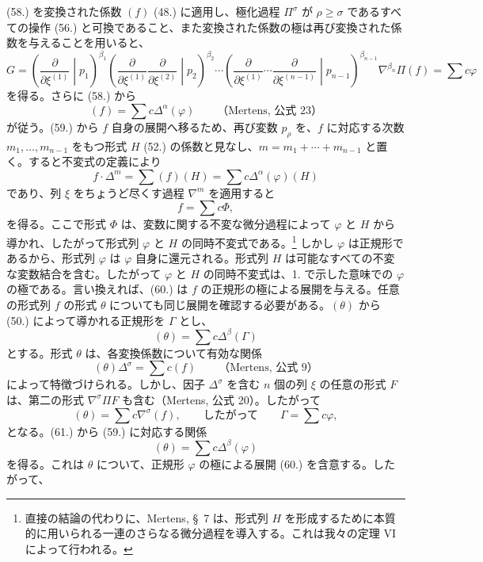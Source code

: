 \documentclass[11pt]{article}
\begin{document}
(58.) を変換された係数 $(f)$ (48.) に適用し、極化過程 $\Pi^\sigma$ が $\rho\ge\sigma$ であるすべての操作 (56.) と可換であること、また変換された係数の極は再び変換された係数を与えることを用いると、
\[
 G=\left(\frac{\partial}{\partial\xi^{(1)}}\middle|p_1\right)^{\beta_1}
 \left(\frac{\partial}{\partial\xi^{(1)}}\frac{\partial}{\partial\xi^{(2)}}\middle|p_2\right)^{\beta_2}
 \cdots
 \left(\frac{\partial}{\partial\xi^{(1)}}\cdots\frac{\partial}{\partial\xi^{(n-1)}}\middle|p_{n-1}\right)^{\beta_{n-1}}
 \nabla^{\beta_n}\Pi(f)=\sum c\varphi
\]
を得る。さらに (58.) から
\begin{equation}
 (f)=\sum c\Delta^\alpha(\varphi)\qquad\text{（Mertens, 公式 23）}
\tag{59}
\end{equation}
が従う。(59.) から $f$ 自身の展開へ移るため、再び変数 $p_\rho$ を、$f$ に対応する次数 $m_1,\ldots,m_{n-1}$ をもつ形式 $H$ (52.) の係数と見なし、$m=m_1+\cdots+m_{n-1}$ と置く。すると不変式の定義により
\[
 f\cdot\Delta^m=\sum(f)(H)=\sum c\Delta^\alpha(\varphi)(H)
\]
であり、列 $\xi$ をちょうど尽くす過程 $\nabla^m$ を適用すると
\begin{equation}
 f=\sum c\Phi,
\tag{60}
\end{equation}
を得る。ここで形式 $\Phi$ は、変数に関する不変な微分過程によって $\varphi$ と $H$ から導かれ、したがって形式列 $\varphi$ と $H$ の同時不変式である。\footnote{直接の結論の代わりに、Mertens, \S\ 7 は、形式列 $H$ を形成するために本質的に用いられる一連のさらなる微分過程を導入する。これは我々の定理 VI によって行われる。} しかし $\varphi$ は正規形であるから、形式列 $\varphi$ は $\varphi$ 自身に還元される。形式列 $H$ は可能なすべての不変な変数結合を含む。したがって $\varphi$ と $H$ の同時不変式は、1. で示した意味での $\varphi$ の極である。言い換えれば、(60.) は $f$ の正規形の極による展開を与える。任意の形式列 $f$ の形式 $\theta$ についても同じ展開を確認する必要がある。$(\theta)$ から (50.) によって導かれる正規形を $\Gamma$ とし、
\begin{equation}
 (\theta)=\sum c\Delta^\beta(\Gamma)
\tag{61}
\end{equation}
とする。形式 $\theta$ は、各変換係数について有効な関係
\[
 (\theta)\Delta^\sigma=\sum c(f)\qquad\text{（Mertens, 公式 9）}
\]
によって特徴づけられる。しかし、因子 $\Delta^\sigma$ を含む $n$ 個の列 $\xi$ の任意の形式 $F$ は、第二の形式 $\nabla^\sigma\Pi F$ も含む（Mertens, 公式 20）。したがって
\[
 (\theta)=\sum c\nabla^\sigma(f),\qquad\text{したがって}\qquad \Gamma=\sum c\varphi,
\]
となる。(61.) から (59.) に対応する関係
\[
 (\theta)=\sum c\Delta^\beta(\varphi)
\]
を得る。これは $\theta$ について、正規形 $\varphi$ の極による展開 (60.) を含意する。したがって、
\end{document}
